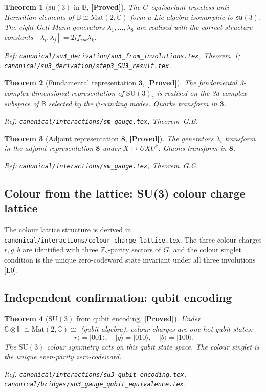 \documentclass[12pt,a4paper]{article}
\newtheorem{theorem}{Theorem}[section]
\theoremstyle{definition}
\theoremstyle{remark}
\newcommand{\PROVED}{\textbf{[Proved]}}
\newcommand{\SU}[1]{\mathrm{SU}(#1)}
\newcommand{\Bq}{\mathbb{C}\otimes\mathbb{H}}
\begin{document}
\begin{theorem}[$\mathfrak{su}(3)$ in $\mathbb{B}$, \PROVED]
\label{thm:su3_involutions}
The $G$-equivariant traceless anti-Hermitian elements of
$\mathbb{B}\cong\mathrm{Mat}(2,\mathbb{C})$ form a Lie algebra isomorphic to
$\mathfrak{su}(3)$.
The eight Gell-Mann generators $\lambda_1,\ldots,\lambda_8$ are realised
with the correct structure constants $[\lambda_i,\lambda_j] = 2i f_{ijk}\lambda_k$.

Ref: \texttt{canonical/su3\_derivation/su3\_from\_involutions.tex},
Theorem~1; \texttt{canonical/su3\_derivation/step3\_SU3\_result.tex}.
\end{theorem}

\begin{theorem}[Fundamental representation $\mathbf{3}$, \PROVED]
\label{thm:fundamental}
The fundamental 3-complex-dimensional representation of $\SU{3}_c$ is
realised on the 3d complex subspace of $\mathbb{B}$ selected by the
$\psi$-winding modes.
Quarks transform in $\mathbf{3}$.

Ref: \texttt{canonical/interactions/sm\_gauge.tex}, Theorem~G.B.
\end{theorem}

\begin{theorem}[Adjoint representation $\mathbf{8}$, \PROVED]
\label{thm:adjoint}
The generators $\lambda_i$ transform in the adjoint representation
$\mathbf{8}$ under $X\mapsto UXU^\dagger$.
Gluons transform in $\mathbf{8}$.

Ref: \texttt{canonical/interactions/sm\_gauge.tex}, Theorem~G.C.
\end{theorem}

\subsection{Colour from the lattice: SU(3) colour charge lattice}

The colour lattice structure is derived in
\texttt{canonical/interactions/colour\_charge\_lattice.tex}.
The three colour charges $r, g, b$ are identified with three
$\mathbb{Z}_2$-parity sectors of $G$, and the colour singlet
condition is the unique zero-codeword state invariant under all
three involutions [L0].

\subsection{Independent confirmation: qubit encoding}

\begin{theorem}[$\SU{3}$ from qubit encoding, \PROVED]
\label{thm:su3_qubit}
Under $\Bq\cong\mathrm{Mat}(2,\mathbb{C})\cong$ (qubit algebra), colour charges
are one-hot qubit states:
\[
  |r\rangle = |001\rangle,\quad |g\rangle = |010\rangle,\quad |b\rangle = |100\rangle.
\]
The $\SU{3}$ colour symmetry acts on this qubit state space.
The colour singlet is the unique even-parity zero-codeword.

Ref: \texttt{canonical/interactions/su3\_qubit\_encoding.tex};
\texttt{canonical/bridges/su3\_gauge\_qubit\_equivalence.tex}.
\end{theorem}
\end{document}
